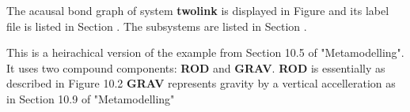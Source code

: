 

   The acausal bond graph of system \textbf{twolink} is
   displayed in Figure  and its label
   file is listed in Section .
   The subsystems are listed in Section .

This is a heirachical version of the example from Section 10.5 of
"Metamodelling".  It uses two compound components: {\bf ROD} and {\bf
GRAV}.  {\bf ROD} is essentially as described in Figure 10.2 {\bf
GRAV} represents gravity by a vertical accelleration as in Section
10.9 of "Metamodelling"

